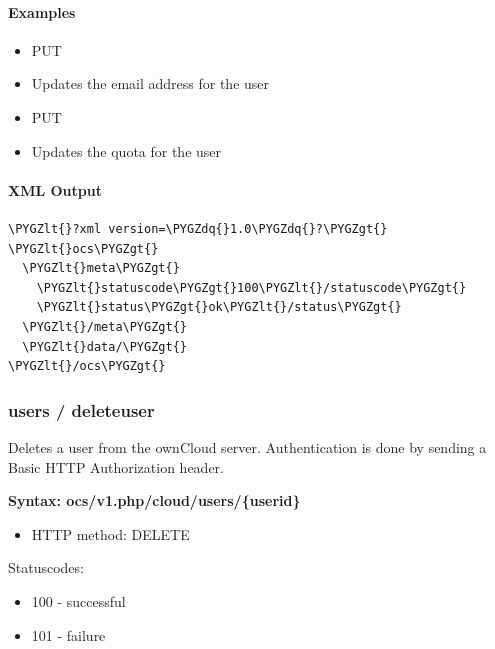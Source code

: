 \documentclass[letterpaper,10pt,english]{sphinxmanual}
\def\PYGZlt{\char`\<}
\def\PYGZgt{\char`\>}
\def\PYGZdq{\char`\"}
\begin{document}
\paragraph{Examples}
\label{configuration_user/user_provisioning_api:examples}\begin{itemize}
\item {} 
PUT 

\item {} 
Updates the email address for the user 

\item {} 
PUT 

\item {} 
Updates the quota for the user 

\end{itemize}


\paragraph{XML Output}
\label{configuration_user/user_provisioning_api:id5}
\begin{Verbatim}[commandchars=\\\{\}]
\PYGZlt{}?xml version=\PYGZdq{}1.0\PYGZdq{}?\PYGZgt{}
\PYGZlt{}ocs\PYGZgt{}
  \PYGZlt{}meta\PYGZgt{}
    \PYGZlt{}statuscode\PYGZgt{}100\PYGZlt{}/statuscode\PYGZgt{}
    \PYGZlt{}status\PYGZgt{}ok\PYGZlt{}/status\PYGZgt{}
  \PYGZlt{}/meta\PYGZgt{}
  \PYGZlt{}data/\PYGZgt{}
\PYGZlt{}/ocs\PYGZgt{}
\end{Verbatim}


\subsubsection{\textbf{users / deleteuser}}
\label{configuration_user/user_provisioning_api:users-deleteuser}
Deletes a user from the ownCloud server. Authentication is done by sending a
Basic HTTP Authorization header.

\textbf{Syntax: ocs/v1.php/cloud/users/\{userid\}}
\begin{itemize}
\item {} 
HTTP method: DELETE

\end{itemize}

Statuscodes:
\begin{itemize}
\item {} 
100 - successful

\item {} 
101 - failure

\end{itemize}
\end{document}
